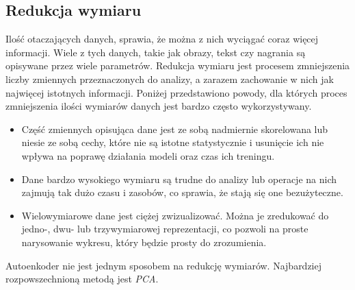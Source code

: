 \documentclass[a4paper,12pt,oneside]{book} %
\begin{document}
\subsection{Redukcja wymiaru}
Ilość otaczających danych, sprawia, że można z nich wyciągać coraz więcej informacji. Wiele z tych danych, takie jak obrazy, tekst czy nagrania są opisywane przez wiele parametrów. Redukcja wymiaru jest procesem zmniejszenia liczby zmiennych przeznaczonych do analizy, a zarazem zachowanie w nich jak najwięcej istotnych informacji. Poniżej przedstawiono powody, dla których proces zmniejszenia ilości wymiarów danych jest bardzo często wykorzystywany.
\begin{itemize}
	\item Część zmiennych opisująca dane jest ze sobą nadmiernie skorelowana lub niesie ze sobą cechy, które nie są istotne statystycznie i usunięcie ich nie wpływa na poprawę działania modeli oraz czas ich treningu.
	\item Dane bardzo wysokiego wymiaru są trudne do analizy lub operacje na nich zajmują tak dużo czasu i zasobów, co sprawia, że stają się one bezużyteczne. 
	\item Wielowymiarowe dane jest ciężej zwizualizować. Można je zredukować do jedno-, dwu- lub trzywymiarowej reprezentacji, co pozwoli na proste narysowanie wykresu, który będzie prosty do zrozumienia.
\end{itemize}
Autoenkoder nie jest jednym sposobem na redukcję wymiarów. Najbardziej rozpowszechnioną metodą jest \textit{PCA}. 
\end{document}
